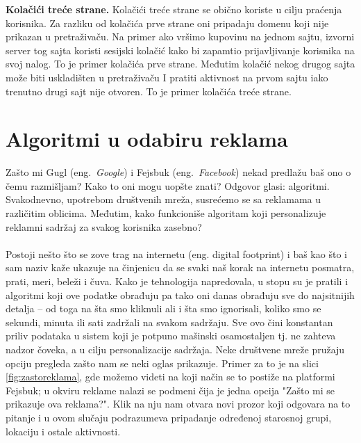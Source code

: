 \documentclass[a4paper]{article}
\begin{document}
	\textbf{Kolačići treće strane.} Kolačići treće strane se obično koriste u cilju praćenja korisnika. Za razliku od kolačića prve strane oni pripadaju domenu koji nije prikazan u pretraživaču. Na primer ako vršimo kupovinu na jednom sajtu, izvorni server tog sajta koristi sesijski kolačić kako bi zapamtio prijavljivanje korisnika na svoj nalog. To je primer kolačića prve strane. Međutim kolačić nekog drugog sajta može biti uskladišten u pretraživaču I pratiti aktivnost na prvom sajtu iako trenutno drugi sajt nije otvoren. To je primer kolačića treće strane. 
	
	\section{Algoritmi u odabiru reklama}
	\label{sec:algoritmi}
	Zašto mi Gugl (eng.~{\em Google}) i Fejsbuk (eng.~{\em Facebook}) nekad predlažu baš ono o čemu razmišljam? Kako to oni mogu uopšte znati? Odgovor glasi: algoritmi. Svakodnevno, upotrebom društvenih mreža, susrećemo se sa reklamama u različitim oblicima. Međutim, 		kako funkcioniše algoritam koji personalizuje reklamni sadržaj za svakog korisnika zasebno?\\ \\
	Postoji nešto što se zove trag na internetu (eng. digital footprint) i baš kao što i sam naziv kaže ukazuje na činjenicu da se svaki naš korak na internetu posmatra, prati, meri, beleži i čuva. Kako je tehnologija napredovala, u stopu su je pratili i algoritmi koji ove podatke 		obrađuju pa tako oni danas obrađuju sve do najsitnijih detalja – od toga na šta smo kliknuli ali i šta smo ignorisali, koliko smo se sekundi, minuta ili sati zadržali na svakom sadržaju. Sve ovo čini konstantan priliv podataka u sistem koji je potpuno mašinski osamostaljen tj. ne 		zahteva nadzor čoveka, a u cilju personalizacije sadržaja. Neke društvene mreže pružaju opciju pregleda zašto nam se neki oglas prikazuje. Primer za to je na slici \ref{fig:zastoreklama}, gde možemo videti na koji način se to postiže na platformi Fejsbuk; u okviru reklame nalazi se podmeni čija je jedna opcija "Zašto mi se prikazuje ova reklama?". Klik na nju nam otvara novi prozor koji odgovara na to pitanje i u ovom slučaju podrazumeva pripadanje određenoj starosnoj grupi, lokaciju i ostale aktivnosti. \\
\end{document}
